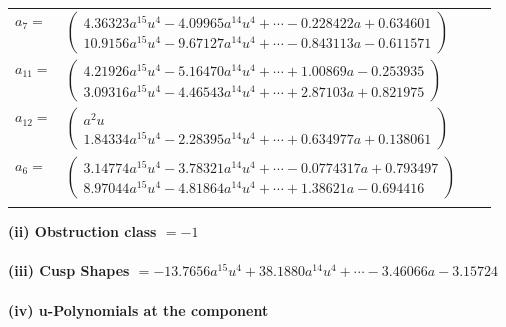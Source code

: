 \documentclass[1p]{elsarticle_modified}
\theoremstyle{definition}
\begin{document}
\begin{tabular}{m{7pt} m{180pt} m{7pt} m{180pt} }
\flushright $a_{7}=$&$\begin{pmatrix}4.36323 a^{15} u^{4}-4.09965 a^{14} u^{4}+\cdots-0.228422 a+0.634601\\10.9156 a^{15} u^{4}-9.67127 a^{14} u^{4}+\cdots-0.843113 a-0.611571\end{pmatrix}$ \\
\flushright $a_{11}=$&$\begin{pmatrix}4.21926 a^{15} u^{4}-5.16470 a^{14} u^{4}+\cdots+1.00869 a-0.253935\\3.09316 a^{15} u^{4}-4.46543 a^{14} u^{4}+\cdots+2.87103 a+0.821975\end{pmatrix}$ \\
\flushright $a_{12}=$&$\begin{pmatrix}a^2 u\\1.84334 a^{15} u^{4}-2.28395 a^{14} u^{4}+\cdots+0.634977 a+0.138061\end{pmatrix}$ \\
\flushright $a_{6}=$&$\begin{pmatrix}3.14774 a^{15} u^{4}-3.78321 a^{14} u^{4}+\cdots-0.0774317 a+0.793497\\8.97044 a^{15} u^{4}-4.81864 a^{14} u^{4}+\cdots+1.38621 a-0.694416\end{pmatrix}$\\&\end{tabular}
\flushleft \textbf{(ii) Obstruction class $= -1$}\\~\\
\flushleft \textbf{(iii) Cusp Shapes $= -13.7656 a^{15} u^{4}+38.1880 a^{14} u^{4}+\cdots-3.46066 a-3.15724$}\\~\\
\newpage\renewcommand{\arraystretch}{1}
\flushleft \textbf{(iv) u-Polynomials at the component}\newline \\
\end{document}
